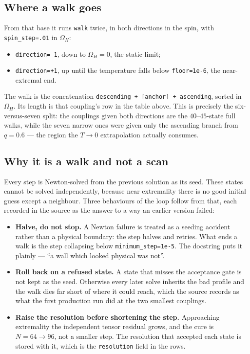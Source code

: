 \documentclass[11pt,a4paper]{article}
\newcommand{\q}[1]{\subsection*{\color{accent}#1}}
\begin{document}
\q{Where a walk goes}

From that base it runs \texttt{walk} twice, in both directions in the spin,
with \texttt{spin\_step=.01} in $\Omega_H$:
\begin{itemize}\itemsep1pt
  \item \texttt{direction=-1}, down to $\Omega_H=0$, the static limit;
  \item \texttt{direction=+1}, up until the temperature falls below
        \texttt{floor=1e-6}, the near-extremal end.
\end{itemize}
The walk is the concatenation \texttt{descending + [anchor] + ascending},
sorted in $\Omega_H$. Its length is that coupling's row in the table above.
This is precisely the six-versus-seven split: the couplings given both
directions are the $40$--$45$-state full walks, while the seven narrow ones
were given only the ascending branch from $q=0.6$ --- the region the $T\to0$
extrapolation actually consumes.

\q{Why it is a walk and not a scan}

Every step is Newton-solved from the previous solution as its seed. These
states cannot be solved independently, because near extremality there is no
good initial guess except a neighbour. Three behaviours of the loop follow from
that, each recorded in the source as the answer to a way an earlier version
failed:

\begin{itemize}\itemsep3pt
  \item \textbf{Halve, do not stop.} A Newton failure is treated as a seeding
  accident rather than a physical boundary: the step halves and retries. What
  ends a walk is the step collapsing below \texttt{minimum\_step=1e-5}. The
  docstring puts it plainly --- ``a wall which looked physical was not''.

  \item \textbf{Roll back on a refused state.} A state that misses the
  acceptance gate is not kept as the seed. Otherwise every later solve inherits
  the bad profile and the walk dies far short of where it could reach, which
  the source records as what the first production run did at the two smallest
  couplings.

  \item \textbf{Raise the resolution before shortening the step.} Approaching
  extremality the independent tensor residual grows, and the cure is
  $N=64\to96$, not a smaller step. The resolution that accepted each state is
  stored with it, which is the \texttt{resolution} field in the rows.
\end{itemize}
\end{document}
